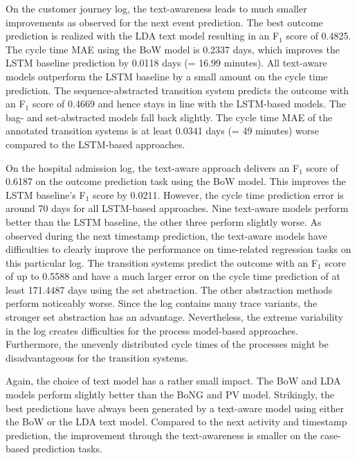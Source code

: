 On the customer journey log, the text-awareness leads to much smaller improvements as observed for the next event prediction.
The best outcome prediction is realized with the LDA text model resulting in an F$_1$ score of 0.4825.
The cycle time MAE using the BoW model is 0.2337 days, which improves the LSTM baseline prediction by 0.0118 days (= 16.99 minutes).
All text-aware models outperform the LSTM baseline by a small amount on the cycle time prediction.
The sequence-abstracted transition system predicts the outcome with an F$_1$ score of 0.4669 and hence stays in line with the LSTM-based models.
The bag- and set-abstracted models fall back slightly.
The cycle time MAE of the annotated transition systems is at least 0.0341 days (= 49 minutes) worse compared to the LSTM-based approaches.

On the hospital admission log, the text-aware approach delivers an F$_1$ score of 0.6187 on the outcome prediction task using the BoW model.
This improves the LSTM baseline's F$_1$ score by 0.0211.
However, the cycle time prediction error is around 70 days for all LSTM-based approaches.
Nine text-aware models perform better than the LSTM baseline, the other three perform slightly worse.
As observed during the next timestamp prediction, the text-aware models have difficulties to clearly improve the performance on time-related regression tasks on this particular log.
The transition systems predict the outcome with an F$_1$ score of up to 0.5588 and have a much larger error on the cycle time prediction of at least 171.4487 days using the set abstraction.
The other abstraction methods perform noticeably worse.
Since the log contains many trace variants, the stronger set abstraction has an advantage.
Nevertheless, the extreme variability in the log creates difficulties for the process model-based approaches.
Furthermore, the unevenly distributed cycle times of the processes might be disadvantageous for the transition systems.

Again, the choice of text model has a rather small impact.
The BoW and LDA models perform slightly better than the BoNG and PV model.
Strikingly, the best predictions have always been generated by a text-aware model using either the BoW or the LDA text model.
Compared to the next activity and timestamp prediction, the improvement through the text-awareness is smaller on the case-based prediction tasks.

